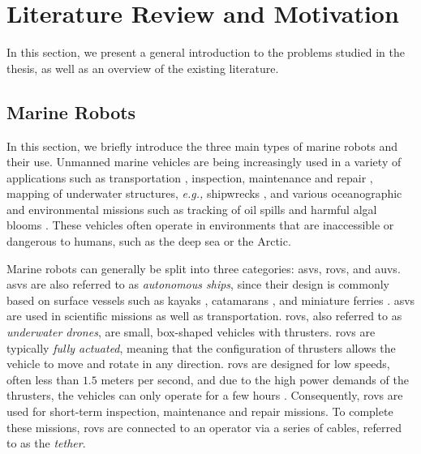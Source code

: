 \section{Literature Review and Motivation}
\label{sec:introduction_literature}

In this section, we present a general introduction to the problems studied in the thesis, as well as an overview of the existing literature.

\subsection{Marine Robots}

In this section, we briefly introduce the three main types of marine robots and their use.
Unmanned marine vehicles are being increasingly used in a variety of applications such as transportation \cite{pi_transportation_2021,brekke_milliampere_2022}, inspection, maintenance and repair \cite{palomer_inspection_2019,mcleod_inspection_repair_maintenance_2010}, mapping of underwater structures, \emph{e.g.,} shipwrecks \cite{bingham_shipwreck_2010}, and various oceanographic and environmental missions such as tracking of oil spills \cite{petillo_plume_tracking_2012} and harmful algal blooms \cite{robbins_harmful_algae_2006}.
These vehicles often operate in environments that are inaccessible or dangerous to humans, such as the deep sea or the Arctic.

Marine robots can generally be split into three categories: \glspl{asv}, \glspl{rov}, and \glspl{auv}.
\Glspl{asv} are also referred to as \emph{autonomous ships}, since their design is commonly based on surface vessels such as kayaks \cite{kimball_jetkayak_2014}, catamarans \cite{choi_asv_2020,zolich_catamaran_2022}, and miniature ferries \cite{brekke_milliampere_2022}. \Glspl{asv} are used in scientific missions as well as transportation.
\Glspl{rov}, also referred to as \emph{underwater drones}, are small, box-shaped vehicles with thrusters.
\Glspl{rov} are typically \emph{fully actuated}, meaning that the configuration of thrusters allows the vehicle to move and rotate in any direction.
\Glspl{rov} are designed for low speeds, often less than $1.5$ meters per second, and due to the high power demands of the thrusters, the vehicles can only operate for a few hours \cite{bluerov2}.
Consequently, \glspl{rov} are used for short-term inspection, maintenance and repair missions.
To complete these missions, \glspl{rov} are connected to an operator via a series of cables, referred to as the \emph{tether}.

